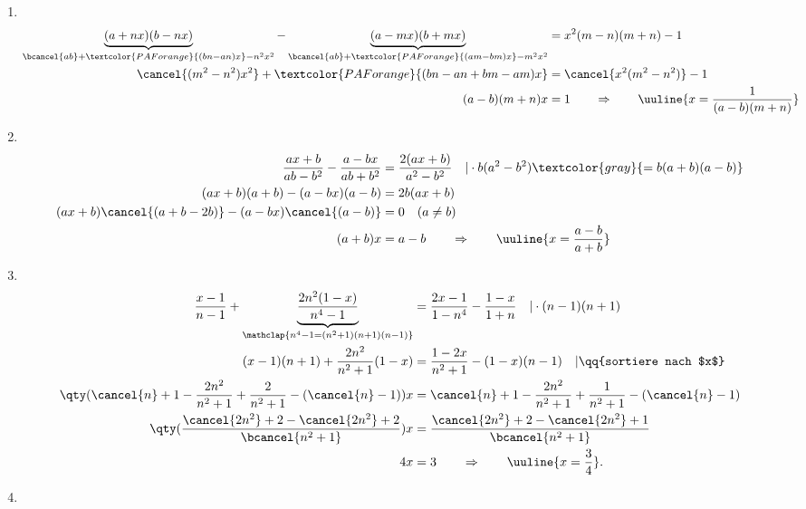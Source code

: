 \begin{enumerate}[label=(\alph*)]
    \item $~$\\[-1.45 cm]
    \begin{align} 
        \underbrace{(a+nx)(b-nx)}_{\bcancel{ab} + \textcolor{PAForange}{(bn-an)x} - n^2 x^2}-\underbrace{(a-mx)(b+mx)}_{\bcancel{ab}+\textcolor{PAForange}{(am-bm)x} - m^2 x^2} &= x^2(m-n)(m+n)-1 \\ 
        \cancel{(m^2-n^2)x^2} + \textcolor{PAForange}{(bn -an + bm -am)x} &= \cancel{x^2 (m^2 -n^2)} -1 \\
        (a-b)(m+n) x&=1 \qquad \Rightarrow \qquad \uuline{x = \frac{1}{(a-b)(m+n)}}
    \end{align}
    \item $~$\\[-1.45 cm]
    \begin{align}
        \frac{ax+b}{ab-b^2}-\frac{a-bx}{ab+b^2} &=\frac{2(ax+b)}{a^2-b^2} \quad |\cdot b(a^2 - b^2) \textcolor{gray}{= b(a+b)(a-b)} \\
        (ax+b)(a+b) - (a-bx)(a-b) &= 2b(ax+b) \\
        (ax+b)\cancel{(a+b-2b)} - (a-bx)\cancel{(a-b)} &= 0 \quad (a\neq b) \\
        (a+b) x &= a-b \qquad \Rightarrow \qquad \uuline{x= \frac{a-b}{a+b}}
    \end{align}
    \item $~$\\[-1.45cm]
    \begin{align}
        \frac{x-1}{n-1}+\underbrace{\frac{2n^2(1-x)}{n^4-1}}_{\mathclap{n^4-1 = (n^2+1)(n+1)(n-1)}}&=\frac{2x-1}{1-n^4}-\frac{1-x}{1+n} \quad |\cdot (n-1)(n+1)\\
        (x-1)(n+1) + \frac{2n^2}{n^2 + 1} (1-x) &= \frac{1-2x}{n^2+1} - (1-x)(n-1) \quad | \qq{sortiere nach $x$}\\
        \qty(\cancel{n}+1 - \frac{2n^2}{n^2+1} + \frac{2}{n^2+1} -(\cancel{n}-1))x &= \cancel{n}+1 - \frac{2n^2}{n^2+1} + \frac{1}{n^2+1} -(\cancel{n}-1) \\
        \qty(\frac{\cancel{2n^2} + 2 - \cancel{2n^2} + 2}{\bcancel{n^2 + 1}}) x &= \frac{\cancel{2n^2} + 2 - \cancel{2n^2} +1}{\bcancel{n^2+1}} \\
        4x &= 3 \qquad \Rightarrow \qquad \uuline{x = \frac{3}{4}}.
    \end{align}
    \item $~$\\[-1.45cm] 
    \begin{align}

\end{align}
\end{enumerate}
